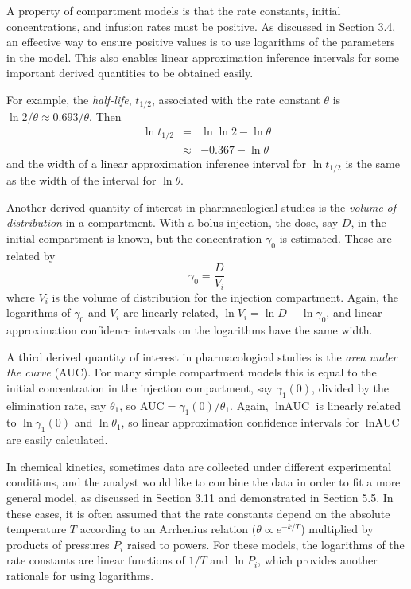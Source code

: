 A property of compartment models is that the rate
constants, initial concentrations, and infusion rates must be
positive.
As discussed in Section 3.4, an effective way to ensure
positive values is to use logarithms of the parameters in the model.
This also enables linear approximation inference intervals
for some important derived quantities to be obtained easily.

For example, the {\em half-life}, $t_{{1/2}}$, associated with the
rate constant $\theta$ is $\ln2 / \theta  \approx  0.693 / \theta$.
Then
\begin{eqnarray}
\ln t_{{1/2}}&=&\ln\ln2  - \ln\theta\\
&\approx&-0.367 - \ln\theta
\end{eqnarray}
and the width of a linear approximation inference interval for
$\ln t_{{1/2}}$ is the same as the width of the
interval for $\ln\theta $.

Another derived quantity of interest in pharmacological studies
is the %
{\em volume of distribution }
in a compartment.
With a bolus injection, the dose, say $D$, in the initial
compartment is known, but the concentration $\gamma_0 $ is
estimated.
These are related by
\begin{displaymath}
  \gamma_0=\frac{D}{V_i}
\end{displaymath}
where $V_{i}$ is the volume of distribution for the injection
compartment.
Again, the logarithms of $\gamma_0 $ and $V_{i}$ are
linearly related,
$\ln V_i =\ln D -\ln\gamma_0 $,
and linear approximation confidence intervals on the logarithms have
the same width.

A third derived quantity of interest in pharmacological studies is
the {\em area under the curve\/} (AUC).
For many simple compartment models this is equal to the initial
concentration in the injection compartment, say $\gamma_1 ( 0 )$,
divided by the elimination rate, say $\theta_{1}$, so
AUC$ = { \gamma_1 ( 0 )} / {\theta_1}$.
Again, $\ln\mbox{AUC}$  is linearly related to $\ln\gamma_1 ( 0 ) $ and
$\ln\theta_1 $, so linear approximation confidence intervals for
$\ln\mbox{AUC}$ are easily calculated.

In chemical kinetics, sometimes data are collected
under different experimental conditions, and the analyst would
like to combine the data in order to fit a more general model,
as discussed in Section 3.11 and demonstrated in Section 5.5.
In these cases, it is often assumed that the rate constants
depend on the absolute temperature $T$ according to an Arrhenius
relation ($\theta \propto e^{-k/T} $) multiplied by products of
pressures $P_{i}$ raised to powers.
For these models, the logarithms of the rate constants are
linear functions of $1/T$ and $\ln P_i$,
which provides another rationale for using logarithms.

